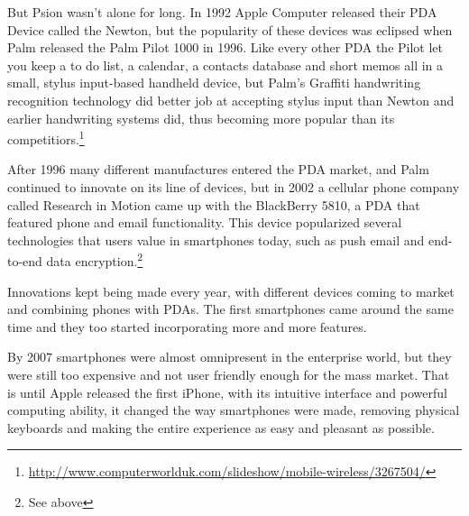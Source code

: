 But Psion wasn't alone for long. In 1992 Apple Computer released their \ac{PDA} Device called the Newton, but the popularity of these devices was eclipsed when Palm released the Palm Pilot 1000 in 1996. Like every other \ac{PDA} the Pilot let you keep a to do list, a calendar, a contacts database and short memos all in a small, stylus input-based handheld device, but Palm's Graffiti handwriting recognition technology did better job at accepting stylus input than Newton and earlier handwriting systems did, thus becoming more popular than its competitiors.\footnote{\url{http://www.computerworlduk.com/slideshow/mobile-wireless/3267504/}}

After 1996 many different manufactures entered the \ac{PDA} market, and Palm continued to innovate on its line of devices, but in 2002 a cellular phone company called Research in Motion came up with the BlackBerry 5810, a \ac{PDA} that featured phone and email functionality. This device popularized several technologies that users value in smartphones today, such as push email and end-to-end data encryption.\footnote{See above}

Innovations kept being made every year, with different devices coming to market and combining phones with \ac{PDA}s. The first smartphones came around the same time and they too started incorporating more and more features.

By 2007 smartphones were almost omnipresent in the enterprise world, but they were still too expensive and not user friendly enough for the mass market. That is until Apple released the first iPhone, with its intuitive interface and powerful computing ability, it changed the way smartphones were made, removing physical keyboards and making the entire experience as easy and pleasant as possible.
 

  


